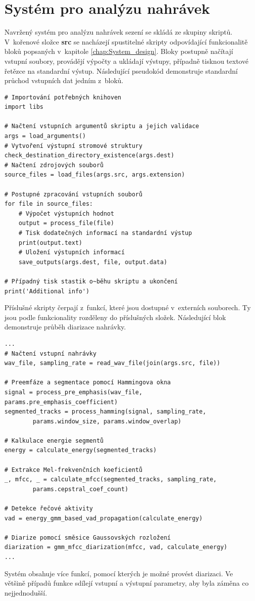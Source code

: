 \section{Systém pro analýzu nahrávek}
\label{section:System}
Navržený systém pro analýzu nahrávek sezení se skládá ze skupiny skriptů. V~kořenové složce \textbf{src} se nacházejí spustitelné skripty odpovídající funkcionalitě bloků popsaných v~kapitole \ref{chap:System_design}. Bloky postupně načítají vstupní soubory, provádějí výpočty a ukládají výstupy, případně tisknou textové řetězce na standardní výstup. Následující pseudokód demonstruje standardní průchod vstupních dat jedním z~bloků.

\begin{verbatim}
# Importování potřebných knihoven
import libs

# Načtení vstupních argumentů skriptu a jejich validace
args = load_arguments()
# Vytvoření výstupní stromové struktury
check_destination_directory_existence(args.dest)
# Načtení zdrojových souborů
source_files = load_files(args.src, args.extension)

# Postupné zpracování vstupních souborů
for file in source_files:
    # Výpočet výstupních hodnot
    output = process_file(file)
    # Tisk dodatečných informací na standardní výstup
    print(output.text)
    # Uložení výstupních informací
    save_outputs(args.dest, file, output.data)

# Případný tisk stastik o~běhu skriptu a ukončení
print('Additional info')
\end{verbatim}

Příslušné skripty čerpají z~funkcí, které jsou dostupné v~externích souborech. Ty jsou podle funkcionality rozděleny do příslušných složek. Následující blok demonstruje průběh diarizace nahrávky.

\begin{verbatim}
...
# Načtení vstupní nahrávky
wav_file, sampling_rate = read_wav_file(join(args.src, file))

# Preemfáze a segmentace pomocí Hammingova okna
signal = process_pre_emphasis(wav_file, params.pre_emphasis_coefficient)
segmented_tracks = process_hamming(signal, sampling_rate,
        params.window_size, params.window_overlap)

# Kalkulace energie segmentů                                   
energy = calculate_energy(segmented_tracks)

# Extrakce Mel-frekvenčních koeficientů
_, mfcc, _ = calculate_mfcc(segmented_tracks, sampling_rate,
        params.cepstral_coef_count)

# Detekce řečové aktivity
vad = energy_gmm_based_vad_propagation(calculate_energy)

# Diarize pomocí směsice Gaussovských rozložení
diarization = gmm_mfcc_diarization(mfcc, vad, calculate_energy)
...
\end{verbatim}
Systém obsahuje více funkcí, pomocí kterých je možné provést diarizaci. Ve většině případů funkce sdílejí vstupní a výstupní parametry, aby byla záměna co nejjednodušší.

